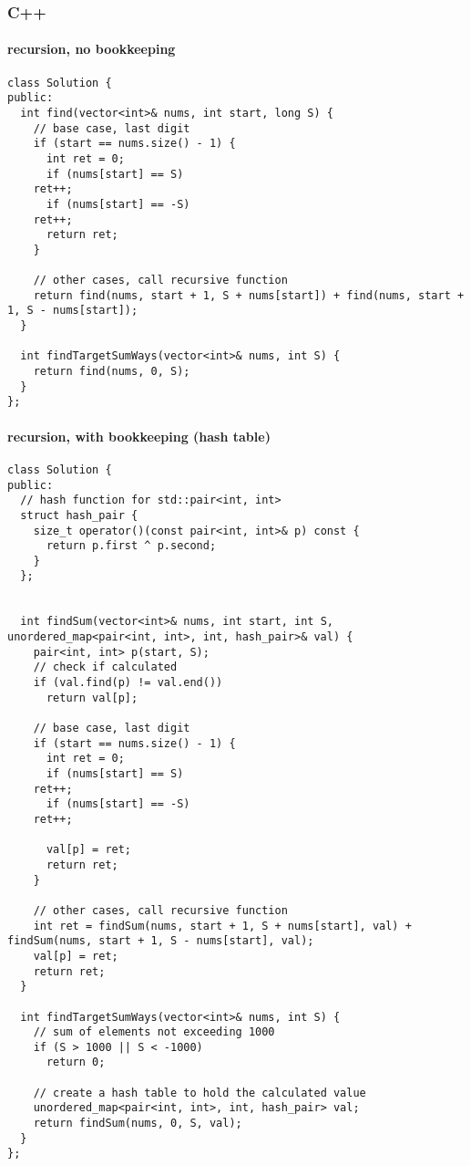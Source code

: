 \documentclass[12pt]{article}
\begin{document}
\subsubsection{C++}
\label{sec:org87b1d95}
\paragraph{recursion, no bookkeeping}
\label{sec:org7223161}
\begin{verbatim}
class Solution {
public:
  int find(vector<int>& nums, int start, long S) {
    // base case, last digit 
    if (start == nums.size() - 1) {
      int ret = 0;
      if (nums[start] == S)
	ret++;
      if (nums[start] == -S)
	ret++;
      return ret;
    }

    // other cases, call recursive function
    return find(nums, start + 1, S + nums[start]) + find(nums, start + 1, S - nums[start]);
  }

  int findTargetSumWays(vector<int>& nums, int S) {
    return find(nums, 0, S);
  }
};
\end{verbatim}
\paragraph{recursion, with bookkeeping (hash table)}
\label{sec:org0bbe16a}
\begin{verbatim}
class Solution {
public:
  // hash function for std::pair<int, int>
  struct hash_pair {
    size_t operator()(const pair<int, int>& p) const {
      return p.first ^ p.second;
    }
  };


  int findSum(vector<int>& nums, int start, int S, unordered_map<pair<int, int>, int, hash_pair>& val) {
    pair<int, int> p(start, S);
    // check if calculated
    if (val.find(p) != val.end())
      return val[p];

    // base case, last digit 
    if (start == nums.size() - 1) {     
      int ret = 0;
      if (nums[start] == S)
	ret++;
      if (nums[start] == -S)
	ret++;

      val[p] = ret;
      return ret;
    }

    // other cases, call recursive function
    int ret = findSum(nums, start + 1, S + nums[start], val) + findSum(nums, start + 1, S - nums[start], val);
    val[p] = ret;
    return ret;
  }

  int findTargetSumWays(vector<int>& nums, int S) {
    // sum of elements not exceeding 1000
    if (S > 1000 || S < -1000)
      return 0;

    // create a hash table to hold the calculated value
    unordered_map<pair<int, int>, int, hash_pair> val;
    return findSum(nums, 0, S, val);
  }
};
\end{verbatim}
\end{document}
